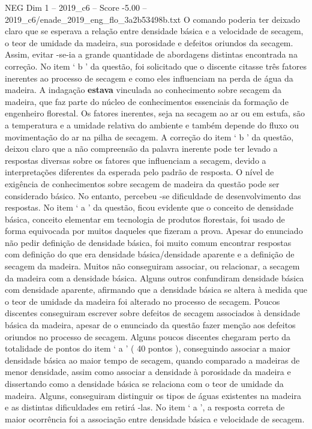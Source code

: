 \begin{textsample}{NEG Dim 1 – 2019\_c6 – Score -5.00 – 2019\_c6/enade\_2019\_eng\_flo\_3a2b53498b.txt}
O comando poderia ter deixado claro que se esperava a relação entre densidade básica e a velocidade de secagem, o teor de umidade da madeira, sua porosidade e defeitos oriundos da secagem.
Assim, evitar -se-ia a grande quantidade de abordagens distintas encontrada na correção.
No item ‘ b ’ da questão, foi solicitado que o discente citasse três fatores inerentes ao processo de secagem e como eles influenciam na perda de água da madeira.
A indagação \textbf{estava} vinculada ao conhecimento sobre secagem da madeira, que faz parte do núcleo de conhecimentos essenciais da formação de engenheiro florestal.
Os fatores inerentes, seja na secagem ao ar ou em estufa, são a temperatura e a umidade relativa do ambiente e também depende do fluxo ou movimentação do ar na pilha de secagem.
A correção do item ‘ b ’ da questão, deixou claro que a não compreensão da palavra inerente pode ter levado a respostas diversas sobre os fatores que influenciam a secagem, devido a interpretações diferentes da esperada pelo padrão de resposta.
O nível de exigência de conhecimentos sobre secagem de madeira da questão pode ser considerado básico.
No entanto, percebeu -se dificuldade de desenvolvimento das respostas.
No item ‘ a ’ da questão, ficou evidente que o conceito de densidade básica, conceito elementar em tecnologia de produtos florestais, foi usado de forma equivocada por muitos daqueles que fizeram a prova.
Apesar do enunciado não pedir definição de densidade básica, foi muito comum encontrar respostas com definição do que era densidade básica/densidade aparente e a definição de secagem da madeira.
Muitos não conseguiram associar, ou relacionar, a secagem da madeira com a densidade básica.
Alguns outros confundiram densidade básica com densidade aparente, afirmando que a densidade básica se altera à medida que o teor de umidade da madeira foi alterado no processo de secagem.
Poucos discentes conseguiram escrever sobre defeitos de secagem associados à densidade básica da madeira, apesar de o enunciado da questão fazer menção aos defeitos oriundos no processo de secagem.
Alguns poucos discentes chegaram perto da totalidade de pontos do item ‘ a ’ ( 40 pontos ), conseguindo associar a maior densidade básica ao maior tempo de secagem, quando comparado a madeiras de menor densidade, assim como associar a densidade à porosidade da madeira e dissertando como a densidade básica se relaciona com o teor de umidade da madeira.
Alguns, conseguiram distinguir os tipos de águas existentes na madeira e as distintas dificuldades em retirá -las.
No item ‘ a ’, a resposta correta de maior ocorrência foi a associação entre densidade básica e velocidade de secagem.

\end{textsample}
